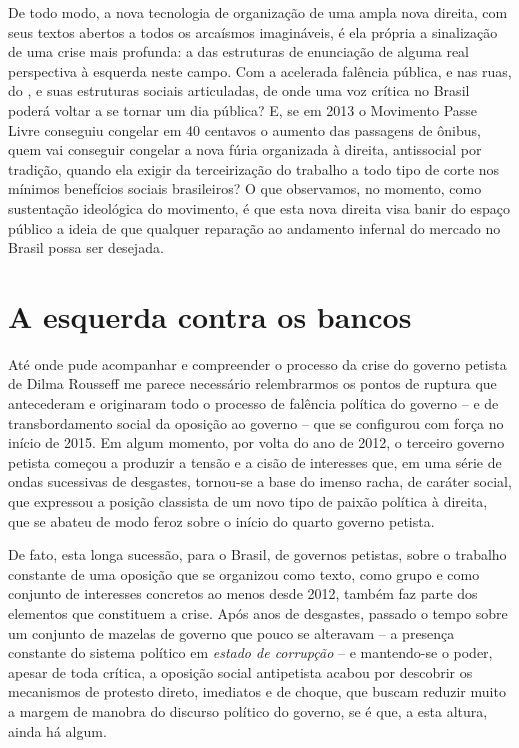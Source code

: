 De todo modo, a nova tecnologia de organização de uma ampla nova
direita, com seus textos abertos a todos os arcaísmos imagináveis, é ela
própria a sinalização de uma crise mais profunda: a das estruturas de
enunciação de alguma real perspectiva à esquerda neste campo. Com a
acelerada falência pública, e nas ruas, do , e suas estruturas sociais
articuladas, de onde uma voz crítica no Brasil poderá voltar a se tornar
um dia pública? E, se em 2013 o Movimento Passe Livre conseguiu congelar
em 40 centavos o aumento das passagens de ônibus, quem vai conseguir
congelar a nova fúria organizada à direita, antissocial por tradição,
quando ela exigir da terceirização do trabalho a todo tipo de corte nos
mínimos benefícios sociais brasileiros? O que observamos, no momento,
como sustentação ideológica do movimento, é que esta nova direita visa
banir do espaço público a ideia de que qualquer reparação ao andamento
infernal do mercado no Brasil possa ser desejada.

  \section{A esquerda contra os
  bancos}\label{a-esquerda-contra-os-bancos}

Até onde pude acompanhar e compreender o processo da crise do governo
petista de Dilma Rousseff me parece necessário relembrarmos os pontos de
ruptura que antecederam e originaram todo o processo de falência
política do governo -- e de transbordamento social da oposição ao
governo -- que se configurou com força no início de 2015. Em algum
momento, por volta do ano de 2012, o terceiro governo petista começou a
produzir a tensão e a cisão de interesses que, em uma série de ondas
sucessivas de desgastes, tornou-se a base do imenso racha, de caráter
social, que expressou a posição classista de um novo tipo de paixão
política à direita, que se abateu de modo feroz sobre o início do quarto
governo petista.

De fato, esta longa sucessão, para o Brasil, de governos petistas, sobre
o trabalho constante de uma oposição que se organizou como texto, como
grupo e como conjunto de interesses concretos ao menos desde 2012,
também faz parte dos elementos que constituem a crise. Após anos de
desgastes, passado o tempo sobre um conjunto de mazelas de governo que
pouco se alteravam -- a presença constante do sistema político em
\emph{estado de corrupção} -- e mantendo-se o poder, apesar de toda
crítica, a oposição social antipetista acabou por descobrir os
mecanismos de protesto direto, imediatos e de choque, que buscam reduzir
muito a margem de manobra do discurso político do governo, se é que, a
esta altura, ainda há algum.

